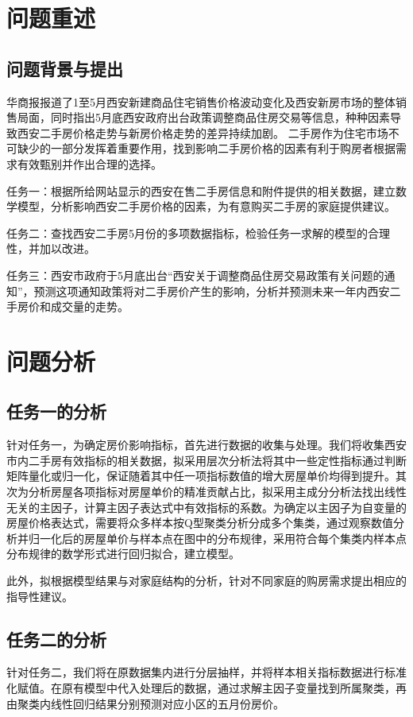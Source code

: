 \documentclass[withoutpreface,bwprint]{cumcmthesis} %
\begin{document}
\section{问题重述}
\subsection{问题背景与提出}
华商报报道了1至5月西安新建商品住宅销售价格波动变化及西安新房市场的整体销售局面，同时指出5月底西安政府出台政策调整商品住房交易等信息，种种因素导致西安二手房价格走势与新房价格走势的差异持续加剧。
二手房作为住宅市场不可缺少的一部分发挥着重要作用，找到影响二手房价格的因素有利于购房者根据需求有效甄别并作出合理的选择。

任务一：根据所给网站显示的西安在售二手房信息和附件提供的相关数据，建立数学模型，分析影响西安二手房价格的因素，为有意购买二手房的家庭提供建议。

任务二：查找西安二手房5月份的多项数据指标，检验任务一求解的模型的合理性，并加以改进。 

任务三：西安市政府于5月底出台“西安关于调整商品住房交易政策有关问题的通知”，预测这项通知政策将对二手房价产生的影响，分析并预测未来一年内西安二手房价和成交量的走势。
\section{问题分析}


\subsection{任务一的分析}
针对任务一，为确定房价影响指标，首先进行数据的收集与处理。我们将收集西安市内二手房有效指标的相关数据，拟采用层次分析法将其中一些定性指标通过判断矩阵量化或归一化，保证随着其中任一项指标数值的增大房屋单价均得到提升。其次为分析房屋各项指标对房屋单价的精准贡献占比，拟采用主成分分析法找出线性无关的主因子，计算主因子表达式中有效指标的系数。为确定以主因子为自变量的房屋价格表达式，需要将众多样本按Q型聚类分析分成多个集类，通过观察数值分析并归一化后的房屋单价与样本点在图中的分布规律，采用符合每个集类内样本点分布规律的数学形式进行回归拟合，建立模型。

此外，拟根据模型结果与对家庭结构的分析，针对不同家庭的购房需求提出相应的指导性建议。
\subsection{任务二的分析}
针对任务二，我们将在原数据集内进行分层抽样，并将样本相关指标数据进行标准化赋值。在原有模型中代入处理后的数据，通过求解主因子变量找到所属聚类，再由聚类内线性回归结果分别预测对应小区的五月份房价。
\end{document}

